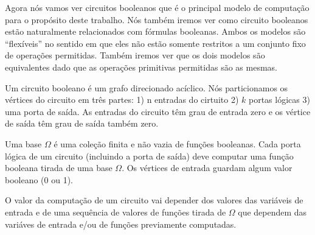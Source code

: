 Agora nós vamos ver circuitos booleanos que é o principal modelo de computação para o propósito deste trabalho. Nós também iremos ver como circuito booleanos estão naturalmente relacionados com fórmulas booleanas. Ambos os modelos são ``flexíveis'' no sentido em que eles não estão somente restritos a um conjunto fixo de operações permitidas. Também iremos ver que os dois modelos são equivalentes dado que as operações primitivas permitidas são as mesmas.

Um circuito booleano é um grafo direcionado acíclico. Nós particionamos os vértices do circuito em três partes: 1) n entradas do cirtuito 2) $k$ portas lógicas 3) uma porta de saída. As entradas do circuito têm grau de entrada zero e os vértice de saída têm grau de saída também zero.

Uma base $\Omega$ é uma coleção finita e não vazia de funções booleanas. Cada porta lógica de um circuito (incluindo a porta de saída) deve computar uma função booleana tirada de uma base $\Omega$. Os vértices de entrada guardam algum valor booleano (0 ou 1).

O valor da computação de um circuito vai depender dos valores das variáveis de entrada e de uma sequência de valores de funções tirada de $\Omega$ que dependem das variáves de entrada e/ou de funções previamente computadas.

